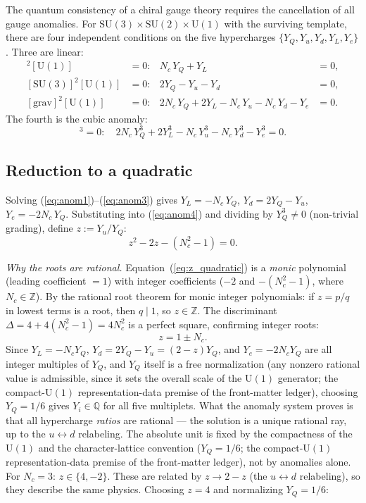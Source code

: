 \documentclass[11pt]{article}
\theoremstyle{definition}
\newcommand{\SU}{\mathrm{SU}}
\newcommand{\U}{\mathrm{U}}
\begin{document}
The quantum consistency of a chiral gauge theory requires the
cancellation of all gauge anomalies.  For
$\SU(3) \times \SU(2) \times \U(1)$ with the surviving template, there
are four independent conditions on the five hypercharges
$\{Y_Q, Y_u, Y_d, Y_L, Y_e\}$.  Three are linear:
\begin{align}
  [\SU(2)]^2[\U(1)] &= 0: &
    N_c\, Y_Q + Y_L &= 0, \label{eq:anom1} \\
  [\SU(3)]^2[\U(1)] &= 0: &
    2Y_Q - Y_u - Y_d &= 0, \label{eq:anom2} \\
  [\mathrm{grav}]^2[\U(1)] &= 0: &
    2N_c\, Y_Q + 2Y_L - N_c\, Y_u - N_c\, Y_d - Y_e &= 0. \label{eq:anom3}
\end{align}
The fourth is the cubic anomaly:
\begin{equation}
  [\U(1)]^3 = 0: \quad
  2N_c\, Y_Q^3 + 2Y_L^3 - N_c\, Y_u^3 - N_c\, Y_d^3 - Y_e^3 = 0.
  \label{eq:anom4}
\end{equation}

\subsection{Reduction to a quadratic}
\label{sec:reduction_quadratic}

Solving (\ref{eq:anom1})--(\ref{eq:anom3}) gives
$Y_L = -N_c\, Y_Q$, $Y_d = 2Y_Q - Y_u$, $Y_e = -2N_c\, Y_Q$.
Substituting into (\ref{eq:anom4}) and dividing by $Y_Q^3 \ne 0$
(non-trivial grading), define $z := Y_u / Y_Q$:
\begin{equation}
  z^2 - 2z - (N_c^2 - 1) = 0.
  \label{eq:z_quadratic}
\end{equation}

\noindent\textit{Why the roots are rational.}\quad
Equation~(\ref{eq:z_quadratic}) is a \emph{monic} polynomial (leading
coefficient $= 1$) with integer coefficients ($-2$ and $-(N_c^2-1)$,
where $N_c \in \mathbb{Z}$).  By the rational root theorem for monic
integer polynomials: if $z = p/q$ in lowest terms is a root, then
$q \mid 1$, so $z \in \mathbb{Z}$.  The discriminant
$\Delta = 4 + 4(N_c^2 - 1) = 4N_c^2$ is a perfect square, confirming
integer roots:
\begin{equation}
  z = 1 \pm N_c.
\end{equation}
Since $Y_L = -N_c Y_Q$, $Y_d = 2Y_Q - Y_u = (2-z)Y_Q$, and
$Y_e = -2N_c Y_Q$ are all integer multiples of $Y_Q$, and $Y_Q$ itself
is a free normalization (any nonzero rational value is admissible, since
it sets the overall scale of the $\U(1)$ generator; the
compact-$\U(1)$ representation-data premise of the front-matter
ledger), choosing
$Y_Q = 1/6$ gives $Y_i \in \mathbb{Q}$ for all five multiplets.
What the anomaly system proves is that all hypercharge \emph{ratios}
are rational --- the solution is a unique rational ray, up to the
$u \leftrightarrow d$ relabeling.  The absolute unit is fixed by the
compactness of the $\U(1)$ and the character-lattice convention
($Y_Q = 1/6$; the compact-$\U(1)$ representation-data premise of the
front-matter ledger), not by anomalies alone.
For $N_c = 3$: $z \in \{4, -2\}$.  These are related by
$z \to 2 - z$ (the $u \leftrightarrow d$ relabeling), so they describe
the same physics.  Choosing $z = 4$ and normalizing $Y_Q = 1/6$:
\end{document}
